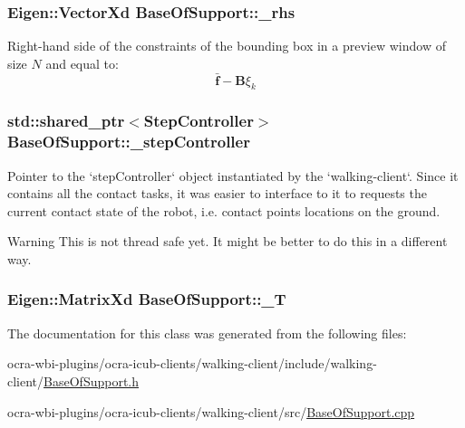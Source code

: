 \hypertarget{classBaseOfSupport_a274325bb39f10aac06153b82a2541c3b}{
\subsubsection[{\-\_\-rhs}]{\setlength{\rightskip}{0pt plus 5cm}\-Eigen\-::\-Vector\-Xd {\bf \-Base\-Of\-Support\-::\-\_\-rhs}}}\label{classBaseOfSupport_a274325bb39f10aac06153b82a2541c3b}
\-Right-\/hand side of the constraints of the bounding box in a preview window of size $N$ and equal to\-: \[ \bar{\mathbf{f}} - \mathbf{B}\xi_k \] \hypertarget{classBaseOfSupport_a023d28c6900f0e97d9de42ca2c5d94a5}{
\subsubsection[{\-\_\-step\-Controller}]{\setlength{\rightskip}{0pt plus 5cm}std\-::shared\-\_\-ptr$<${\bf \-Step\-Controller}$>$ {\bf \-Base\-Of\-Support\-::\-\_\-step\-Controller}}}\label{classBaseOfSupport_a023d28c6900f0e97d9de42ca2c5d94a5}
\-Pointer to the `step\-Controller` object instantiated by the `walking-\/client`. \-Since it contains all the contact tasks, it was easier to interface to it to requests the current contact state of the robot, i.\-e. contact points locations on the ground.

\begin{DoxyWarning}{\-Warning}
\-This is not thread safe yet. \-It might be better to do this in a different way. 
\end{DoxyWarning}
\hypertarget{classBaseOfSupport_a52f07f15e1667eb7876e614dcd817ef1}{
\subsubsection[{\-\_\-\-T}]{\setlength{\rightskip}{0pt plus 5cm}\-Eigen\-::\-Matrix\-Xd {\bf \-Base\-Of\-Support\-::\-\_\-\-T}}}\label{classBaseOfSupport_a52f07f15e1667eb7876e614dcd817ef1}


\-The documentation for this class was generated from the following files\-:\begin{DoxyCompactItemize}
\item 
ocra-\/wbi-\/plugins/ocra-\/icub-\/clients/walking-\/client/include/walking-\/client/\hyperlink{BaseOfSupport_8h}{\-Base\-Of\-Support.\-h}\item 
ocra-\/wbi-\/plugins/ocra-\/icub-\/clients/walking-\/client/src/\hyperlink{BaseOfSupport_8cpp}{\-Base\-Of\-Support.\-cpp}\end{DoxyCompactItemize}
